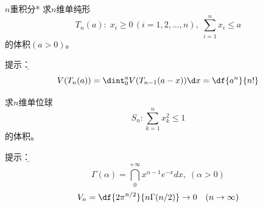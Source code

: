 % 		

\begin{frame}{$n$重积分*}
	\linespread{1.2}
	求$n$维单纯形
		$$T_n(a):\; x_i\geq 0\,(i=1,2,\ldots,n),\;
		\sum\limits_{i=1}^nx_i\leq a$$
		的体积$(a>0)$。
		
	\bigskip\pause
	\alert{提示：}{\it\b 
	$$V(T_n(a))=\dint_0^aV(T_{n-1}(a-x))\d x
	={\df{a^n}{n!}}$$}
\end{frame}



\begin{frame}
	\linespread{1.2}
		求$n$维单位球
		$$S_n:\sum\limits_{k=1}^nx_k^2\leq 1$$
		的体积。
		
	\bigskip\pause
	\alert{提示：}{\it\b
	$${\Gamma(\alpha)=\dint_0^{+\infty}x^{\alpha-1}e^{-x}dx,\;(\alpha>0)}$$
	\pause
	$${V_n=\df{2\pi^{n/2}}{n\Gamma(n/2)}}\to 0\quad(n\to\infty)$$}
\end{frame}

